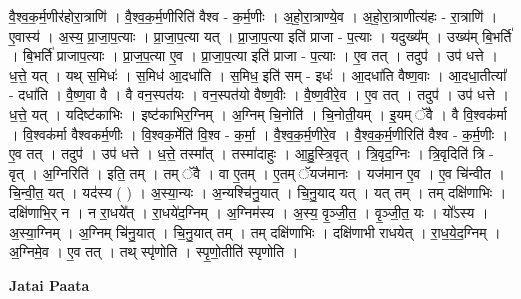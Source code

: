 \documentclass[17pt]{extarticle}
\begin{document}
वै॒श्व॒क॒र्म॒णीर॑होरा॒त्राणि॑ । वै॒श्व॒क॒र्म॒णीरिति॑ वैश्व - क॒र्म॒णीः । अ॒हो॒रा॒त्राण्ये॒व । अ॒हो॒रा॒त्राणीत्य॑हः - रा॒त्राणि॑ । ए॒वास्य॑ । अ॒स्य॒ प्रा॒जा॒प॒त्याः । प्रा॒जा॒प॒त्या यत् । प्रा॒जा॒प॒त्या इति॑ प्राजा - प॒त्याः । यदुख्य᳚म् । उख्य॑म् बि॒भर्ति॑ । बि॒भर्ति॑ प्राजाप॒त्याः । प्रा॒ज॒प॒त्या ए॒व । प्रा॒जा॒प॒त्या इति॑ प्राजा - प॒त्याः । ए॒व तत् । तदुप॑ । उप॑ धत्ते । ध॒त्ते॒ यत् । यथ् स॒मिधः॑ । स॒मिध॑ आ॒दधा॑ति । स॒मिध॒ इति॑ सम् - इधः॑ । आ॒दधा॑ति वैष्ण॒वाः । आ॒दधा॒तीत्या᳚ - दधा॑ति । वै॒ष्ण॒वा वै । वै वन॒स्पत॑यः । वन॒स्पत॑यो वैष्ण॒वीः । वै॒ष्ण॒वीरे॒व । ए॒व तत् । तदुप॑ । उप॑ धत्ते । ध॒त्ते॒ यत् । यदिष्ट॑काभिः । इष्ट॑काभिर॒ग्निम् । अ॒ग्निम् चि॒नोति॑ । चि॒नोती॒यम् । इ॒यम् ॅवै । वै वि॒श्वक॑र्मा । वि॒श्वक॑र्मा वैश्वकर्म॒णीः । वि॒श्वक॒र्मेति॑ वि॒श्व - क॒र्मा॒ । वै॒श्व॒क॒र्म॒णीरे॒व । वै॒श्व॒क॒र्म॒णीरिति॑ वैश्व - क॒र्म॒णीः । ए॒व तत् । तदुप॑ । उप॑ धत्ते । ध॒त्ते॒ तस्मा᳚त् । तस्मा॑दाहुः । आ॒हु॒स्त्रि॒वृत् । त्रि॒वृद॒ग्निः । त्रि॒वृदिति॑ त्रि - वृत् । अ॒ग्निरिति॑ । इति॒ तम् । तम् ॅवै । वा ए॒तम् । ए॒तम् ॅयज॑मानः । यज॑मान ए॒व । ए॒व चि॑न्वीत । चि॒न्वी॒त॒ यत् । यद॑स्य ( ) । अ॒स्या॒न्यः । अ॒न्यश्चि॑नु॒यात् । चि॒नु॒याद् यत् । यत् तम् । तम् दक्षि॑णाभिः । दक्षि॑णाभि॒र् न । न रा॒धये᳚त् । रा॒धये॑द॒ग्निम् । अ॒ग्निम॑स्य । अ॒स्य॒ वृ॒ञ्जी॒त॒ । वृ॒ञ्जी॒त॒ यः । यो᳚ऽस्य । अ॒स्या॒ग्निम् । अ॒ग्निम् चि॑नु॒यात् । चि॒नु॒यात् तम् । तम् दक्षि॑णाभिः । 
दक्षि॑णाभी राधयेत् । रा॒ध॒ये॒द॒ग्निम् । अ॒ग्निमे॒व । ए॒व तत् । तथ् स्पृ॑णोति । स्पृ॒णो॒तीति॑ स्पृणोति । \newline

\textbf{Jatai Paata} \newline
\end{document}
